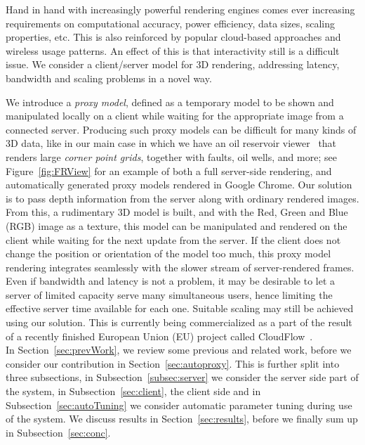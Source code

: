 \documentclass[10pt,conference,compsocconf]{IEEEtran}
\begin{document}
Hand in hand with increasingly powerful rendering engines comes ever increasing
requirements on computational accuracy, power efficiency, data sizes, scaling
properties, etc. This is also reinforced by popular cloud-based approaches and
wireless usage patterns. An effect of this is that interactivity still is a
difficult issue. We consider a client/server model for 3D rendering, addressing
latency, bandwidth and scaling problems in a novel way.

We introduce a {\em proxy model}, defined as a temporary model to be shown and
manipulated locally on a client while waiting for the appropriate image from a
connected server. Producing such proxy models can be difficult for many kinds of
3D data, like in our main case in which we have an oil reservoir
viewer~\cite{cloudviz} that renders large {\em corner point grids}, together
with faults, oil wells, and more; see Figure~\ref{fig:FRView} for an
example of both a full server-side rendering, and automatically generated proxy
models rendered in Google Chrome.
%
Our solution is to pass depth information from the server along with ordinary
rendered images. From this, a rudimentary 3D model is built, and with the Red,
Green and Blue (RGB) image as a texture, this model can be manipulated and
rendered on the client while waiting for the next update from the server. If the
client does not change the position or orientation of the model too much, this
proxy model rendering integrates seamlessly with the slower stream of
server-rendered frames.
%
Even if bandwidth and latency is not a problem, it may be desirable to let a
server of limited capacity serve many simultaneous users, hence limiting the
effective server time available for each one. Suitable scaling may still be
achieved using our solution. This is currently being commercialized as a part of
the result of a recently finished European Union (EU) project called
CloudFlow~\cite{cloudflow}.
\\
In Section~\ref{sec:prevWork}, we review some previous and related work, before
we consider our contribution in Section~\ref{sec:autoproxy}. This is further
split into three subsections, in Subsection~\ref{subsec:server} we consider the
server side part of the system, in Subsection~\ref{sec:client}, the client side
and in Subsection~\ref{sec:autoTuning} we consider automatic parameter tuning
during use of the system. We discuss results in Section~\ref{sec:results},
before we finally sum up in Subsection~\ref{sec:conc}.
\end{document}
